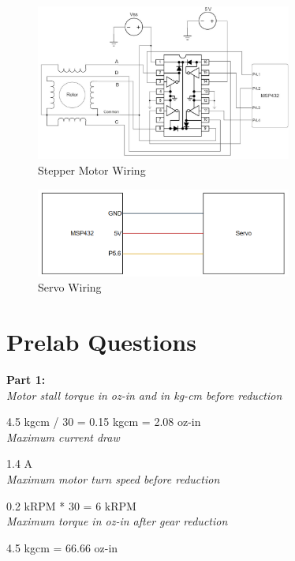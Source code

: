 \documentclass[CMPE]{KGCOEReport}
\begin{document}
\begin{figure}[H]
    \centering
    \includegraphics[width=0.75\textwidth]{StepperWiring.png}
    \caption{Stepper Motor Wiring}
    \label{fig:ServoWiring}
\end{figure}

\begin{figure}[H]
    \centering
    \includegraphics[width=0.75\textwidth]{ServoWiring.png}
    \caption{Servo Wiring}
    \label{fig:SevoWiring}
\end{figure}

\section*{Prelab Questions}

\textbf{Part 1:}\\

\emph{Motor stall torque in oz-in and in kg-cm before reduction}

4.5 kgcm / 30 = 0.15 kgcm = 2.08 oz-in\\

\emph{Maximum current draw}

1.4 A\\

\emph{Maximum motor turn speed before reduction}

0.2 kRPM * 30 = 6 kRPM\\

\emph{Maximum torque in oz-in after gear reduction}

4.5 kgcm = 66.66 oz-in\\
\end{document}
